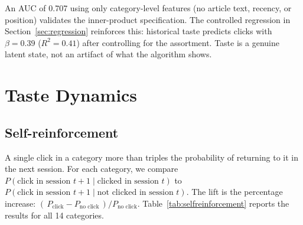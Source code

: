 \documentclass[11pt]{article}
\begin{document}
An AUC of 0.707 using only category-level features (no article text, recency, or position) validates the inner-product specification. The controlled regression in Section~\ref{sec:regression} reinforces this: historical taste predicts clicks with $\beta = 0.39$ ($R^2 = 0.41$) after controlling for the assortment. Taste is a genuine latent state, not an artifact of what the algorithm shows.


\section{Taste Dynamics}
\label{sec:taste}

\subsection{Self-reinforcement}

A single click in a category more than triples the probability of returning to it in the next session. For each category, we compare $P(\text{click in session } t{+}1 \mid \text{clicked in session } t)$ to $P(\text{click in session } t{+}1 \mid \text{not clicked in session } t)$. The lift is the percentage increase: $(\,P_{\text{click}} - P_{\text{no click}}\,) / P_{\text{no click}}$. Table~\ref{tab:selfreinforcement} reports the results for all 14 categories.
\end{document}
